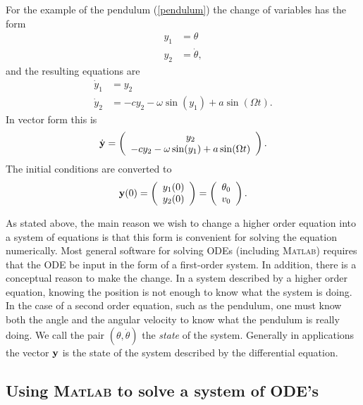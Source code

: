 For the example of the pendulum (\ref{pendulum}) the change of variables
has the form
\begin{equation*}
\begin{split}
y_1 &= \theta\\
y_2 &= \dot{\theta},
\end{split}
\end{equation*}
and the resulting equations are
\begin{equation}\label{pendsys}
\begin{split}
\dot{y}_1 &= y_2\\
\dot{y}_2 &= -c y_2 - \omega \sin(y_1) + a \sin(\Omega t).
\end{split}
\end{equation}
In vector form this is
\[
\dot{\mathbf{y}}=\left(\begin{array}{c}y_2  \\
		 -c y_2 - \omega \sin(y_1) + a \sin(\Omega t) \end{array} \right).
\]
The initial conditions are converted to
\begin{equation}
\mathbf{y}(0) = \left(\begin{array}{c} y_1(0) \\ y_2(0) \end{array} \right)
       = \left(\begin{array}{c} \theta_0 \\ v_0 \end{array} \right).
\end{equation}

As stated above, the main reason we wish to change a higher order equation
into a system of equations is that this form is convenient for solving the
equation numerically. Most general software for solving
ODEs (including \textsc{Matlab}) requires that the ODE be input in the form
of a first-order system. In addition, there is a conceptual reason to
make the change. In a system described by a higher order equation, knowing
the position is not enough to know what the system is doing. In the case
of a second order equation, such as the pendulum, one must know both the
angle and the angular velocity to know what the pendulum is really doing.
We call the pair $(\theta, \dot{\theta})$ the
{\em state} of the system. Generally in applications the vector $\mathbf{y}$ is
the state of the system described by the differential equation.



\subsection*{Using \textsc{Matlab} to solve a system of ODE's}

